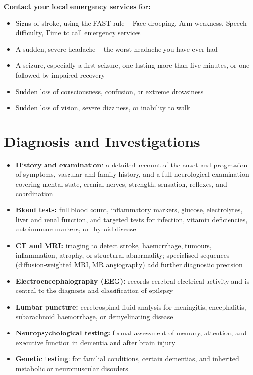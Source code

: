 \textbf{Contact your local emergency services for:}
\begin{itemize}
    \item Signs of stroke, using the FAST rule -- Face drooping, Arm weakness, Speech difficulty, Time to call emergency services
    \item A sudden, severe headache -- the worst headache you have ever had
    \item A seizure, especially a first seizure, one lasting more than five minutes, or one followed by impaired recovery
    \item Sudden loss of consciousness, confusion, or extreme drowsiness
    \item Sudden loss of vision, severe dizziness, or inability to walk
\end{itemize}

\section*{Diagnosis and Investigations}
\begin{itemize}
    \item \textbf{History and examination:} a detailed account of the onset and progression of symptoms, vascular and family history, and a full neurological examination covering mental state, cranial nerves, strength, sensation, reflexes, and coordination
    \item \textbf{Blood tests:} full blood count, inflammatory markers, glucose, electrolytes, liver and renal function, and targeted tests for infection, vitamin deficiencies, autoimmune markers, or thyroid disease
    \item \textbf{CT and MRI:} imaging to detect stroke, haemorrhage, tumours, inflammation, atrophy, or structural abnormality; specialised sequences (diffusion-weighted MRI, MR angiography) add further diagnostic precision
    \item \textbf{Electroencephalography (EEG):} records cerebral electrical activity and is central to the diagnosis and classification of epilepsy
    \item \textbf{Lumbar puncture:} cerebrospinal fluid analysis for meningitis, encephalitis, subarachnoid haemorrhage, or demyelinating disease
    \item \textbf{Neuropsychological testing:} formal assessment of memory, attention, and executive function in dementia and after brain injury
    \item \textbf{Genetic testing:} for familial conditions, certain dementias, and inherited metabolic or neuromuscular disorders
\end{itemize}

